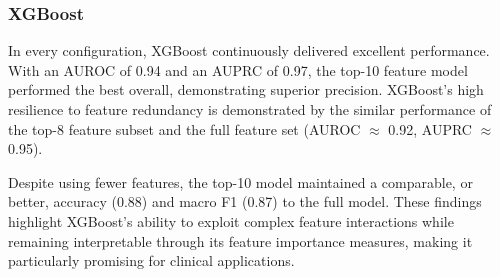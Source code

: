 \documentclass[a4paper,12pt]{article}
\begin{document}
\subsubsection{XGBoost}
In every configuration, XGBoost continuously delivered excellent performance.  With an AUROC of 0.94 and an AUPRC of 0.97, the top-10 feature model performed the best overall, demonstrating superior precision.  XGBoost's high resilience to feature redundancy is demonstrated by the similar performance of the top-8 feature subset and the full feature set (AUROC $\approx$ 0.92, AUPRC $\approx$ 0.95).

Despite using fewer features, the top-10 model maintained a comparable, or better, accuracy (0.88) and macro F1 (0.87) to the full model. These findings highlight XGBoost’s ability to exploit complex feature interactions while remaining interpretable through its feature importance measures, making it particularly promising for clinical applications.
\end{document}

